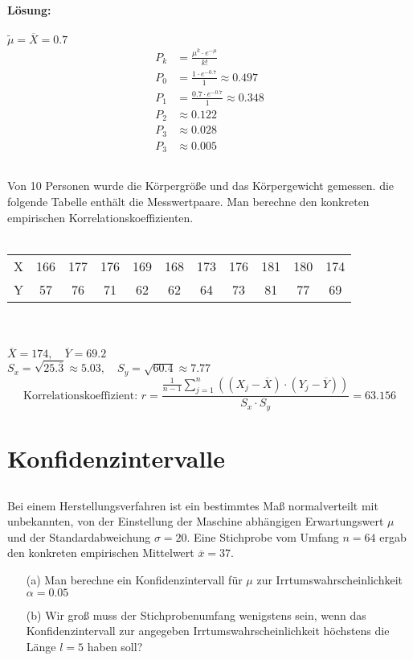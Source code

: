 \documentclass[ngerman]{scrartcl}
\begin{document}
\paragraph{Lösung:}
$\tilde{\mu} = \overline{X} = 0.7$
\begin{align*}
P_k &= \frac{\mu^{k}\cdot e^{-\mu}}{k!}\\
P_0 &= \frac{1\cdot e^{-0.7}}{1}\approx 0.497\\
P_1 &= \frac{0.7\cdot e^{-0.7}}{1}\approx 0.348\\
P_2 &\approx 0.122\\
P_3 &\approx 0.028\\
P_3 &\approx 0.005
\end{align*}

\subsection{}
Von 10 Personen wurde die Körpergröße und das Körpergewicht gemessen. die folgende Tabelle enthält die Messwertpaare. Man berechne den konkreten empirischen Korrelationskoeffizienten.\\
\\
\begin{tabular}{c c c c c c c c c c c }
\hline
X& 166& 177& 176& 169& 168& 173& 176&181& 180& 174\\
Y& 57& 76& 71& 62& 62& 64& 73& 81& 77& 69\\\hline
\end{tabular} \\\\

$\overline{X} = 174,\quad \overline{Y} = 69.2$\\
$S_x = \sqrt{25.\overline{3}}\approx 5.03,\quad S_y = \sqrt{60.4}\approx 7.77$
\begin{equation*}
\text{Korrelationskoeffizient: }r = \frac{\frac{1}{n-1} \sum_{j=1}^{n}\left((X_j - \overline{X})\cdot (Y_j - \overline{Y})\right)}{S_x \cdot S_y} = 63.156
\end{equation*}
\section{Konfidenzintervalle}
\subsection{}
Bei einem Herstellungsverfahren ist ein bestimmtes Maß normalverteilt mit unbekannten, von der Einstellung der Maschine abhängigen Erwartungswert $\mu$ und der Standardabweichung $\sigma = 20$. Eine Stichprobe vom Umfang $n=64$ ergab den konkreten empirischen Mittelwert $\overline{x} = 37$.
\begin{enumerate}
\item[(a)] Man berechne ein Konfidenzintervall für $\mu$ zur Irrtumswahrscheinlichkeit $\alpha = 0.05$
\item[(b)] Wir groß muss der Stichprobenumfang wenigstens sein, wenn das Konfidenzintervall zur angegeben Irrtumswahrscheinlichkeit höchstens die Länge $l=5$ haben soll?
\end{enumerate}
\end{document}
